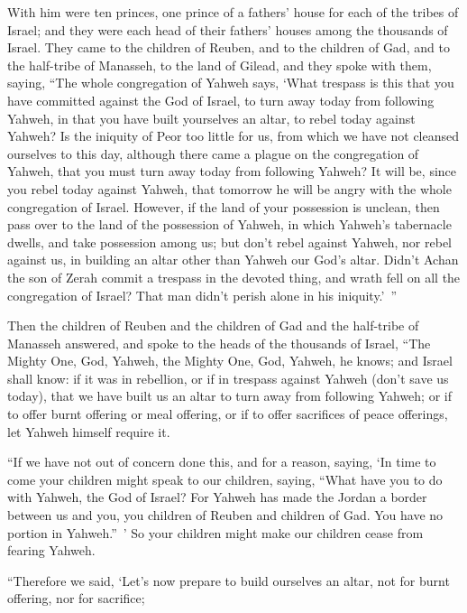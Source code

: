 {With him were ten princes, one prince of a fathers’ house for each of the tribes of Israel; and they were each head of their fathers’ houses among the thousands of Israel.
They came to the children of Reuben, and to the children of Gad, and to the half-tribe of Manasseh, to the land of Gilead, and they spoke with them, saying,
“The whole congregation of Yahweh says, ‘What trespass is this that you have committed against the God of Israel, to turn away today from following Yahweh, in that you have built yourselves an altar, to rebel today against Yahweh?
Is the iniquity of Peor too little for us, from which we have not cleansed ourselves to this day, although there came a plague on the congregation of Yahweh,
that you must turn away today from following Yahweh? It will be, since you rebel today against Yahweh, that tomorrow he will be angry with the whole congregation of Israel.
However, if the land of your possession is unclean, then pass over to the land of the possession of Yahweh, in which Yahweh’s tabernacle dwells, and take possession among us; but don’t rebel against Yahweh, nor rebel against us, in building an altar other than Yahweh our God’s altar.
Didn’t Achan the son of Zerah commit a trespass in the devoted thing, and wrath fell on all the congregation of Israel? That man didn’t perish alone in his iniquity.’ ”
\par }{\PP {}Then the children of Reuben and the children of Gad and the half-tribe of Manasseh answered, and spoke to the heads of the thousands of Israel,
“The Mighty One, God, Yahweh, the Mighty One, God, Yahweh, he knows; and Israel shall know: if it was in rebellion, or if in trespass against Yahweh (don’t save us today),
that we have built us an altar to turn away from following Yahweh; or if to offer burnt offering or meal offering, or if to offer sacrifices of peace offerings, let Yahweh himself require it.
\par }{\PP {}“If we have not out of concern done this, and for a reason, saying, ‘In time to come your children might speak to our children, saying, “What have you to do with Yahweh, the God of Israel?
For Yahweh has made the Jordan a border between us and you, you children of Reuben and children of Gad. You have no portion in Yahweh.” ’ So your children might make our children cease from fearing Yahweh.
\par }{\PP {}“Therefore we said, ‘Let’s now prepare to build ourselves an altar, not for burnt offering, nor for sacrifice;
}
